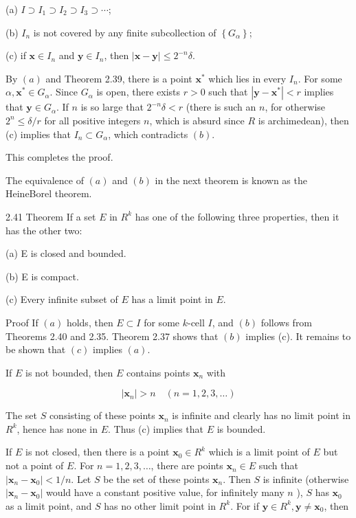 \documentclass[10pt]{article}
\begin{document}
(a) $I \supset I_{1} \supset I_{2} \supset I_{3} \supset \cdots$;

(b) $I_{n}$ is not covered by any finite subcollection of $\left\{G_{\alpha}\right\}$;

(c) if $\mathbf{x} \in I_{n}$ and $\mathbf{y} \in I_{n}$, then $|\mathbf{x}-\mathbf{y}| \leq 2^{-n} \delta$.

By $(a)$ and Theorem 2.39, there is a point $\mathbf{x}^{*}$ which lies in every $I_{n}$. For some $\alpha, \mathbf{x}^{*} \in G_{\alpha}$. Since $G_{\alpha}$ is open, there exists $r>0$ such that $\left|\mathbf{y}-\mathbf{x}^{*}\right|<r$ implies that $\mathbf{y} \in G_{\alpha}$. If $n$ is so large that $2^{-n} \delta<r$ (there is such an $n$, for otherwise $2^{n} \leq \delta / r$ for all positive integers $n$, which is absurd since $R$ is archimedean), then (c) implies that $I_{n} \subset G_{\alpha}$, which contradicts $(b)$.

This completes the proof.

The equivalence of $(a)$ and $(b)$ in the next theorem is known as the HeineBorel theorem.

2.41 Theorem If a set $E$ in $R^{k}$ has one of the following three properties, then it has the other two:

(a) E is closed and bounded.

(b) E is compact.

(c) Every infinite subset of $E$ has a limit point in $E$.

Proof If $(a)$ holds, then $E \subset I$ for some $k$-cell $I$, and $(b)$ follows from Theorems 2.40 and 2.35. Theorem 2.37 shows that $(b)$ implies (c). It remains to be shown that $(c)$ implies $(a)$.

If $E$ is not bounded, then $E$ contains points $\mathbf{x}_{n}$ with

$$
\left|\mathbf{x}_{n}\right|>n \quad(n=1,2,3, \ldots)
$$

The set $S$ consisting of these points $\mathbf{x}_{n}$ is infinite and clearly has no limit point in $R^{k}$, hence has none in $E$. Thus (c) implies that $E$ is bounded.

If $E$ is not closed, then there is a point $\mathbf{x}_{0} \in R^{k}$ which is a limit point of $E$ but not a point of $E$. For $n=1,2,3, \ldots$, there are points $\mathbf{x}_{n} \in E$ such that $\left|\mathbf{x}_{n}-\mathbf{x}_{0}\right|<1 / n$. Let $S$ be the set of these points $\mathbf{x}_{n}$. Then $S$ is infinite (otherwise $\left|\mathbf{x}_{n}-\mathbf{x}_{0}\right|$ would have a constant positive value, for infinitely many $n$ ), $S$ has $\mathbf{x}_{0}$ as a limit point, and $S$ has no other limit point in $R^{k}$. For if $\mathbf{y} \in R^{k}, \mathbf{y} \neq \mathbf{x}_{0}$, then
\end{document}

